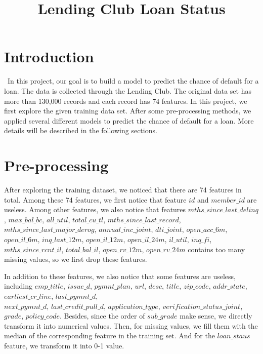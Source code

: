 \documentclass[12pt]{article}
\title{Lending Club Loan Status}
\begin{document}
%
\maketitle

\section{Introduction}
\quad\ In this project, our goal is to build a model to predict the chance of default for a loan. The data is collected through the Lending Club. The original data set has more than 130,000 records and each record has 74 features. In this project, we first explore the given training data set. After some pre-processing methods, we applied several different models to predict the chance of default for a loan. More details will be described in the following sections.

\section{Pre-processing}
After exploring the training dataset, we noticed that there are 74 features in total. Among these 74 features, we first notice that feature $id$ and $member\_id$ are useless. Among other features, we also notice that features $mths\_since\_last\_delinq$, $ max\_bal\_bc $, $ all\_util $, $ total\_cu\_tl $, $ mths\_since\_last\_record$, \\$ mths\_since\_last\_major\_derog $, $ annual\_inc\_joint $, $ dti\_joint $, $ open\_acc\_6m $, $ open\_il\_6m $, $ inq\_last\_12m $, $ open\_il\_12m $, $ open\_il\_24m $, $ il\_util $, $ inq\_fi $, \\$ mths\_since\_rcnt\_il $, $ total\_bal\_il $, $ open\_rv\_12m $, $ open\_rv\_24m $ contains too many missing values, so we first drop these features.

In addition to these features, we also notice that some features are useless, including $emp\_title$, $issue\_d$, $pymnt\_plan$, $url$, $desc$, $title$, $zip\_code$, $addr\_state$, $earliest\_cr\_line$, $last\_pymnt\_d$, \\$next\_pymnt\_d$, $last\_credit\_pull\_d$, $application\_type$, $verification\_status\_joint$, $grade$, $policy\_code$. Besides, since the order of $sub\_grade$ make sense, we directly transform it into numerical values. Then, for missing values, we fill them with the median of the corresponding feature in the training set. And for the $loan\_staus$ feature, we transform it into 0-1 value.
\end{document}
